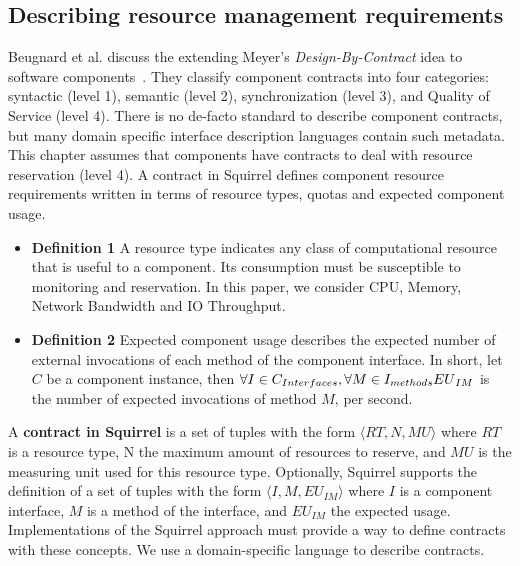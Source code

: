 \subsection{Describing resource management requirements}
Beugnard et al. discuss the extending Meyer's \textit{Design-By-Contract} idea to software components~\cite{Beugnard774917}.
They classify component contracts into four categories: syntactic (level 1), semantic (level 2), synchronization (level 3), and Quality of Service (level 4).
There is no de-facto standard to describe component contracts, but many domain specific interface description languages contain such metadata.
This chapter assumes that components have contracts to deal with resource reservation (level 4).
A contract in Squirrel defines component resource requirements written in terms of resource types, quotas and expected component usage.
\begin{itemize}
\item{\textbf{Definition 1}} A resource type indicates any class of computational resource that is useful to a component.
Its consumption must be susceptible to monitoring and reservation.
In this paper, we consider CPU, Memory, Network Bandwidth and IO Throughput.

\item{\textbf{Definition 2}} Expected component usage describes the expected number of external invocations of each method of the component interface.
In short, let $C$ be a component instance, then $\forall{I \in C_{Interfaces}}, \forall{M \in I_{methods}} \\ {EU}_{IM}$ is the number of expected invocations of method $M$, per second.

\end{itemize}

A \textbf{contract in Squirrel} is a set of tuples with the form $\langle RT, N, MU \rangle$ where $RT$ is a resource type, N the maximum amount of resources to reserve, and $MU$ is the measuring unit used for this resource type.
Optionally, Squirrel supports the definition of a set of tuples with the form $\langle I, M, {EU}_{IM} \rangle$ where $I$ is a component interface, $M$ is a method of the interface, and ${EU}_{IM}$ the expected usage.
Implementations of the Squirrel approach must provide a way to define contracts with these concepts.
We use a domain-specific language to describe contracts.

